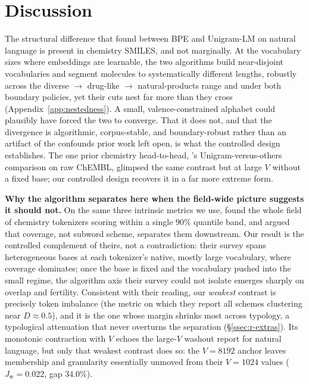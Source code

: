 \documentclass{article}
\begin{document}
\section{Discussion}\label{sec:discussion}

The structural difference that \citet{bostrom2020bpe-suboptimal} found
between BPE and Unigram-LM on natural language is present in chemistry
SMILES, and not marginally. At the vocabulary sizes where embeddings are
learnable, the two algorithms build near-disjoint vocabularies and segment
molecules to systematically different lengths, robustly across the diverse
$\to$ drug-like $\to$ natural-products range and under both boundary policies,
yet their cuts nest far more than they cross (Appendix~\ref{app:nestedness}). A small,
valence-constrained alphabet could plausibly have forced the two to converge.
That it does not, and that the divergence is algorithmic, corpus-stable, and
boundary-robust rather than an artifact of the confounds prior work left open,
is what the controlled design establishes. The one prior chemistry head-to-head,
\citet{temizer2024chemical-tokenization}'s Unigram-versus-others comparison on raw
ChEMBL, glimpsed the same contrast but at large $V$ without a fixed base; our
controlled design recovers it in a far more extreme form.

\textbf{Why the algorithm separates here when the field-wide picture
suggests it should not.} On the same three intrinsic metrics we use,
\citet{wadell2026smirk} found the whole field of chemistry tokenizers
scoring within a single $90\%$ quantile band, and argued that coverage,
not subword scheme, separates them downstream. Our result is the
controlled complement of theirs, not a contradiction: their survey spans
heterogeneous bases at each tokenizer's native, mostly large vocabulary,
where coverage dominates; once the base is fixed and the vocabulary pushed
into the small regime, the algorithm axis their survey could not isolate
emerges sharply on overlap and fertility. Consistent with their reading, our
\emph{weakest} contrast is precisely token imbalance (the metric on which they
report all schemes clustering near $D \approx 0.5$), and it is the one whose
margin shrinks most across typology, a typological attenuation that never
overturns the separation (\S\ref{ssec:r-extras}). Its monotonic contraction with
$V$ echoes the large-$V$ washout \citet{reddy2025diminishing-tokenization} report
for natural language, but only that weakest contrast does so: the $V{=}8192$
anchor leaves membership and granularity essentially unmoved from their
$V{=}1024$ values ($J_{\mathrm{w}}{=}0.022$, gap $34.0\%$).
\end{document}
